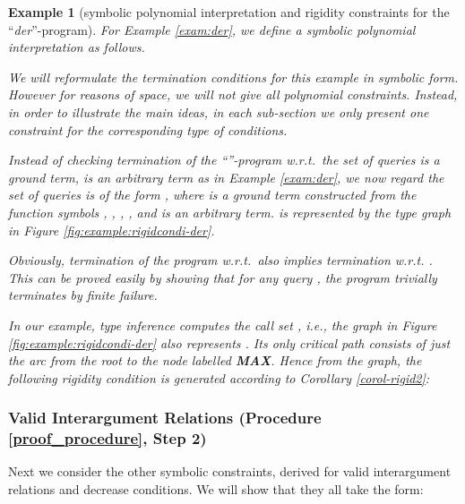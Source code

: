 \documentclass[envcountsame]{tlp}
\newcounter{polycons2ctr}
\newcounter{polycons1ctr}
\newcounter{ex:der-lastsymconsctr}
\newtheorem{example}{Example}
\begin{document}
\begin{example}[symbolic polynomial interpretation and 
rigidity constraints for the ``\textit{der}''-program]
\label{der:symbolrigidcond}
For Example \ref{exam:der},
we define a symbolic polynomial interpretation  as 
follows.








We will reformulate the termination conditions for this example in symbolic form. However
for reasons of space, we
will not give all polynomial constraints. Instead, in order to illustrate the main
ideas, in each sub-section we only present one constraint for the corresponding type of
conditions. 

Instead of checking termination of the ``''-program w.r.t.\
the set of queries  is a ground term,  is an
arbitrary term  
as in Example \ref{exam:der}, we now regard the set of queries  is of the form ,  
where  is a ground term constructed from the function symbols , , ,
, and  is an arbitrary term.  is represented by the type graph in
Figure \ref{fig:example:rigidcondi-der}. 

Obviously, termination of
the program w.r.t.\  also implies termination w.r.t. . 
This can be proved easily by showing
		that for any query , the program trivially 
terminates by finite failure. 


In our example,
type inference \cite{Janssensetal92} computes the call set ,
i.e., the graph in Figure \ref{fig:example:rigidcondi-der} also represents
. Its only critical path consists of just the arc from the root to the
node labelled \textbf{MAX}. Hence from 
the graph, the following rigidity
condition is generated according to Corollary \ref{corol-rigid2}: 
               
\hfill{}
\end{example}






\subsubsection{Valid Interargument Relations (Procedure \ref{proof_procedure}, Step 2)}
\label{Valid_Interargument_Relations}
\hspace*{\fill}

\vspace*{.2cm}

\noindent
Next we consider the other symbolic constraints, derived for valid interargument 
relations and decrease conditions. We will show that they all take the form:
\setcounter{polycons2ctr}{\value{equation}}
\end{document}
